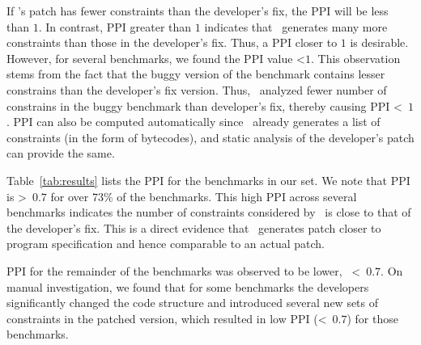 \begin{mylist}
If \tool's patch has fewer constraints than the developer's fix, the PPI will be
less than $1$. In contrast, PPI greater than $1$ indicates that \tool\ generates
many more constraints than those in the developer's fix. Thus, a PPI closer to
$1$ is desirable. However, for several benchmarks, we found the PPI value
\textless $1$. This observation stems from the fact that the buggy version of
the benchmark contains lesser constrains than the developer's fix version.
Thus, \tool\ analyzed fewer number of constrains in the buggy benchmark than
developer's fix, thereby causing PPI \textless\ $1$. PPI can also be computed
automatically since \tool\ already generates a list of constraints (in the form
of bytecodes), and static analysis of the developer's patch can provide the
same.

Table~\ref{tab:results} lists the PPI for the benchmarks in our set. We note
that PPI is \textgreater\ $0.7$ for over $73\%$ of the benchmarks. This high PPI
across several benchmarks indicates the number of  constraints
considered by \tool\ is close to that of the developer's fix. This is a direct
evidence that \tool\ generates patch closer to program specification and hence
comparable to an actual patch. PPI for the remainder
of the benchmarks was observed to be lower, \ie\ \textless\ $0.7$. On manual
investigation, we found that for some benchmarks the developers significantly
changed the code structure and
introduced several new sets of constraints in the patched version, which
resulted in low PPI (\textless\ $0.7$) for those benchmarks.



\end{mylist}
